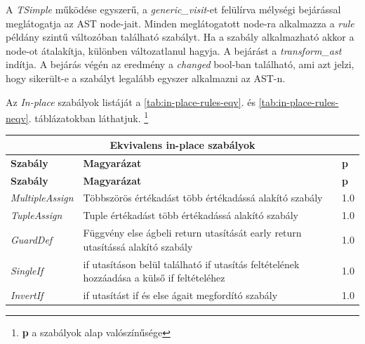 A \emph{TSimple} működése egyszerű,
a \emph{generic\_visit}-et felülírva mélységi bejárással meglátogatja az AST node-jait.
Minden meglátogatott node-ra alkalmazza
a \emph{rule} példány szintű változóban található szabályt.
Ha a szabály alkalmazható akkor a node-ot átalakítja, különben változatlanul hagyja.
A bejárást a \emph{transform\_ast} indítja.
A bejárás végén az eredmény a \emph{changed} bool-ban található,
ami azt jelzi, hogy sikerült-e a szabályt legalább egyszer alkalmazni az AST-n.

Az \emph{In-place} szabályok listáját a \ref{tab:in-place-rules-eqv}. és \ref{tab:in-place-rules-neqv}.
táblázatokban láthatjuk.
\footnote{\textbf{p} a szabályok alap valószínűsége}

\begin{center}
	\begin{longtable}{ | p{} | p{} | p{} | }
		\hline
		\multicolumn{3}{|c|}{\textbf{Ekvivalens in-place szabályok}}
		\\ \hline
		
		\textbf{Szabály} & \textbf{Magyarázat} & \textbf{p}
		\\ \hline \hline
		\endfirsthead %
		
		\hline
		\textbf{Szabály} & \textbf{Magyarázat} & \textbf{p}
		\\ \hline \hline
		\endhead %
		
		\hline
		\endfoot %
		
		\endlastfoot %
		
		\emph{MultipleAssign}
		& Többszörös értékadást több értékadássá alakító szabály
		& 1.0
		\\ \hline

		\emph{TupleAssign}
		& Tuple értékadást több értékadássá alakító szabály
		& 1.0
		\\ \hline

		\emph{GuardDef}
		& Függvény else ágbeli return utasítását early return utasítássá alakító szabály
		& 1.0
		\\ \hline

		\emph{SingleIf}
		& if utasításon belül található if utasítás feltételének hozzáadása a külső if feltételéhez
		& 1.0
		\\ \hline
		
		\emph{InvertIf}
		& if utasítást if és else ágait megfordító szabály
		& 1.0
		\\ \hline


\end{longtable}
\end{center}
